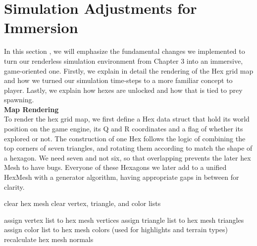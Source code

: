 \documentclass[12pt,a4paper]{report}
\begin{document}
	\section{Simulation Adjustments for Immersion}

	In this section , we will emphasize the fundamental changes we implemented to turn our renderless simulation environment from Chapter 3 into an immersive, game-oriented one. Firstly, we explain in detail the rendering of the Hex grid map and how we turned our simulation time-steps to a more familiar concept to player. Lastly, we explain how hexes are unlocked and how that is tied to prey spawning. \\

	\textbf{Map Rendering} \\

	To render the hex grid map, we first define a Hex data struct that hold its world position on the game engine, its Q and R coordinates and a flag of whether its explored or not. The construction of one Hex follows the logic of combining the top corners of seven triangles, and rotating them according to match the shape of a hexagon. We need seven and not six, so that overlapping prevents the later hex Mesh to have bugs. Everyone of these Hexagons we later add to a unified HexMesh with a generator algorithm, having appropriate gaps in between for clarity. \\

	\begin{algorithm}[H]
		\caption{Hex Grid Mesh Generation}
		\label{alg:generate_hex_mesh}
		
		
		
		\BlankLine
		
		clear hex mesh\;
		clear vertex, triangle, and color lists\;
		
		
		assign vertex list to hex mesh vertices\;
		assign triangle list to hex mesh triangles\;
		assign color list to hex mesh colors (used for highlights and terrain types)\;
		recalculate hex mesh normals\;
		
	\end{algorithm}
\end{document}
